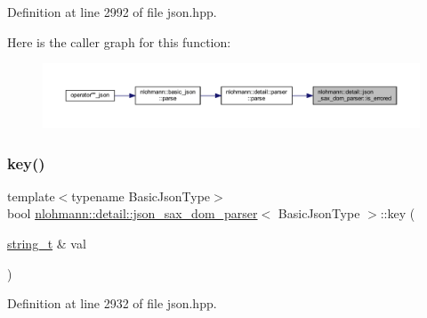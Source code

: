 Definition at line 2992 of file json.\+hpp.

Here is the caller graph for this function\+:
\nopagebreak
\begin{figure}[H]
\begin{center}
\leavevmode
\includegraphics[width=350pt]{classnlohmann_1_1detail_1_1json__sax__dom__parser_ad1b9f3681fadbbb2e0127f5c8a99c662_icgraph}
\end{center}
\end{figure}
\mbox{\label{classnlohmann_1_1detail_1_1json__sax__dom__parser_ad427febda4997cbd8345a2596af66649}} 
\subsubsection{\texorpdfstring{key()}{key()}}
{\footnotesize\ttfamily template$<$typename Basic\+Json\+Type$>$ \\
bool \mbox{\hyperlink{classnlohmann_1_1detail_1_1json__sax__dom__parser}{nlohmann\+::detail\+::json\+\_\+sax\+\_\+dom\+\_\+parser}}$<$ Basic\+Json\+Type $>$\+::key (\begin{DoxyParamCaption}\item[{\mbox{\hyperlink{classnlohmann_1_1detail_1_1json__sax__dom__parser_afd4d961ab2a6b01cbe6e840f7fb90cdc}{string\+\_\+t}} \&}]{val }\end{DoxyParamCaption})\hspace{0.3cm}{\ttfamily [inline]}}



Definition at line 2932 of file json.\+hpp.

\mbox{\label{classnlohmann_1_1detail_1_1json__sax__dom__parser_abb06babaa861f123d8d0cb443b887d8a}} 
